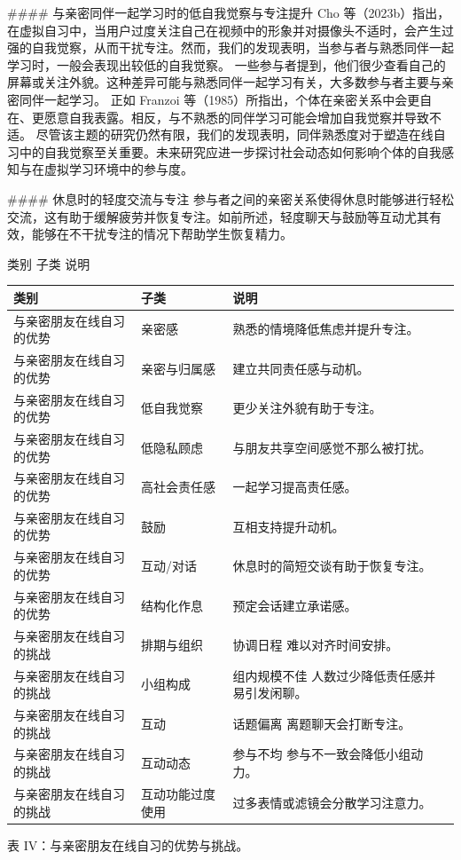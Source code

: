 \documentclass[12pt]{ctexart}
\begin{document}
\#\#\#\# 与亲密同伴一起学习时的低自我觉察与专注提升
Cho 等（2023b）指出，在虚拟自习中，当用户过度关注自己在视频中的形象并对摄像头不适时，会产生过强的自我觉察，从而干扰专注。然而，我们的发现表明，当参与者与熟悉同伴一起学习时，一般会表现出较低的自我觉察。
一些参与者提到，他们很少查看自己的屏幕或关注外貌。这种差异可能与熟悉同伴一起学习有关，大多数参与者主要与亲密同伴一起学习。
正如 Franzoi 等（1985）所指出，个体在亲密关系中会更自在、更愿意自我表露。相反，与不熟悉的同伴学习可能会增加自我觉察并导致不适。
尽管该主题的研究仍然有限，我们的发现表明，同伴熟悉度对于塑造在线自习中的自我觉察至关重要。未来研究应进一步探讨社会动态如何影响个体的自我感知与在虚拟学习环境中的参与度。

\#\#\#\# 休息时的轻度交流与专注
参与者之间的亲密关系使得休息时能够进行轻松交流，这有助于缓解疲劳并恢复专注。如前所述，轻度聊天与鼓励等互动尤其有效，能够在不干扰专注的情况下帮助学生恢复精力。

类别  子类  说明
\begin{table}[H]
\centering
\small
\begin{tabular}{lll}
\toprule
类别 & 子类 & 说明 \\
\midrule
与亲密朋友在线自习的优势 & 亲密感 & 熟悉的情境降低焦虑并提升专注。 \\
与亲密朋友在线自习的优势 & 亲密与归属感 & 建立共同责任感与动机。 \\
与亲密朋友在线自习的优势 & 低自我觉察 & 更少关注外貌有助于专注。 \\
与亲密朋友在线自习的优势 & 低隐私顾虑 & 与朋友共享空间感觉不那么被打扰。 \\
与亲密朋友在线自习的优势 & 高社会责任感 & 一起学习提高责任感。 \\
与亲密朋友在线自习的优势 & 鼓励 & 互相支持提升动机。 \\
与亲密朋友在线自习的优势 & 互动/对话 & 休息时的简短交谈有助于恢复专注。 \\
与亲密朋友在线自习的优势 & 结构化作息 & 预定会话建立承诺感。 \\
与亲密朋友在线自习的挑战 & 排期与组织 & 协调日程 难以对齐时间安排。 \\
与亲密朋友在线自习的挑战 & 小组构成 & 组内规模不佳 人数过少降低责任感并易引发闲聊。 \\
与亲密朋友在线自习的挑战 & 互动 & 话题偏离 离题聊天会打断专注。 \\
与亲密朋友在线自习的挑战 & 互动动态 & 参与不均 参与不一致会降低小组动力。 \\
与亲密朋友在线自习的挑战 & 互动功能过度使用 & 过多表情或滤镜会分散学习注意力。 \\
\bottomrule
\end{tabular}
\end{table}
表 IV：与亲密朋友在线自习的优势与挑战。
\end{document}
